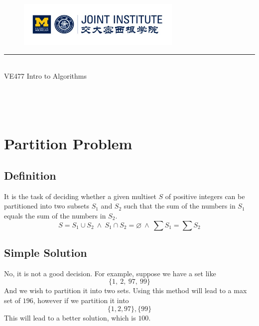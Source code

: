 \documentclass{article}
\begin{document}
\setmainfont{Cormorant Upright}
\renewcommand\arraystretch{1.5}


\thispagestyle{empty}

\begin{center}
\begin{large}
\begin{figure}[!htbp]
\centering
\includegraphics[width=0.7\textwidth]{Logo2}
\end{figure}
\hrule
\vspace*{0.25cm}
 \\
\Large  VE477 Intro to Algorithms\\
\end{large}
\hrulefill

\vspace*{3cm}

\begin{Large}
 \\
\end{Large}
\vspace*{2cm}
\begin{large}
 \\
\end{large}
\end{center}
\newpage
\setmainfont{Optima}
\setmonofont{Optima}
\setsansfont{Optima}
\setcounter{page}{1}
\section{Partition Problem}
\subsection{Definition}
It is the task of deciding whether a given multiset $S$ of positive integers can be partitioned into two subsets $S_1$ and $S_2$ such that the sum of the numbers in $S_1$ equals the sum of the numbers in $S_2$.
\[
	S = S_1 \cup S_2 \ \land \ S_1 \cap S_2 = \varnothing\ \land \ \sum S_1 = \sum S_2
\]
\subsection{Simple Solution}
No, it is not a good decision. For example, suppose we have a set like \[
	\{1,\ 2, \ 97, \ 99 \}
\]
And we wish to partition it into two sets. Using this method will lead to a max set of $196$, however if we partition it into 
\[
	\{1,2,97\}, \{99\}
\]
This will lead to a better solution, which is $100$. 
\end{document}
